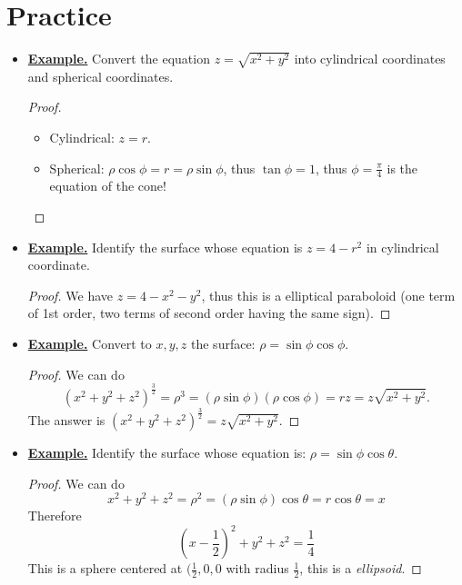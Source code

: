 \section{Practice}
\begin{itemize}

    \item \underline{\textbf{Example.}} Convert the equation $z = \sqrt{x^2+y^2}$ into cylindrical coordinates and spherical coordinates.
    \begin{proof}\quad 
        \begin{itemize}
            \item Cylindrical: $z = r$.
            \item Spherical: $\rho \cos \phi = r = \rho \sin \phi$, thus $\tan \phi = 1$, thus $\phi = \frac{\pi}{4}$ is the equation of the cone!
        \end{itemize}
    \end{proof}
    
    \item \underline{\textbf{Example.}} Identify the surface whose equation is $z = 4-r^2$ in cylindrical coordinate.
    \begin{proof}
        We have $z = 4 - x^2-y^2$, thus this is a elliptical paraboloid (one term of 1st order, two terms of second order having the same sign).
    \end{proof}

    \item \underline{\textbf{Example.}} Convert to $x,y,z$ the surface: $\rho = \sin \phi\cos \phi$.
    \begin{proof} We can do 
    \begin{equation*}
        (x^2+y^2+z^2)^\frac{3}{2}= \rho^3 = (\rho \sin \phi) (\rho\cos \phi) = rz = z\sqrt{x^2+y^2}.
    \end{equation*}
    The answer is $(x^2+y^2+z^2)^\frac{3}{2} = z\sqrt{x^2+y^2}$.
    \end{proof}

    \item \underline{\textbf{Example.}} Identify the surface whose equation is: $\rho = \sin \phi\cos \theta$.
    \begin{proof} We can do 
    \begin{equation*}
        x^2+y^2+z^2 =\rho^2 = (\rho \sin \phi) \cos \theta = r\cos\theta = x
    \end{equation*}
    Therefore 
    \begin{equation*}
        \left(x-\frac{1}{2}\right)^2 + y^2 +z^2 = \frac{1}{4}
    \end{equation*}
    This is a sphere centered at $(\frac{1}{2},0,0$ with radius $\frac{1}{2}$, this is a \emph{ellipsoid}.
    \end{proof}
\end{itemize}